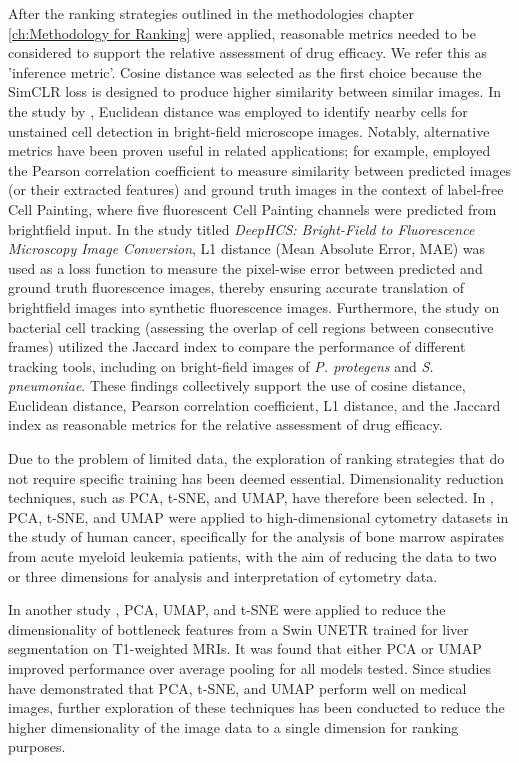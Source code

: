After the ranking strategies outlined in the methodologies chapter  \ref{ch:Methodology for Ranking} were applied, reasonable metrics needed to be considered to support the relative assessment of drug efficacy. We refer this as 'inference metric'. Cosine distance was selected as the first choice because the SimCLR loss is designed to produce higher similarity between similar images. In the study by \cite{Mualla2013ACD}, Euclidean distance was employed to identify nearby cells for unstained cell detection in bright-field microscope images. Notably, alternative metrics have been proven useful in related applications; for example, \cite{CrossZamirski2022LabelFree} employed the Pearson correlation coefficient to measure similarity between predicted images (or their extracted features) and ground truth images in the context of label-free Cell Painting, where five fluorescent Cell Painting channels were predicted from brightfield input. In the study \cite{Lee2018DeepHCS} titled \textit{DeepHCS: Bright-Field to Fluorescence Microscopy Image Conversion}, L1 distance (Mean Absolute Error, MAE) was used as a loss function to measure the pixel-wise error between predicted and ground truth fluorescence images, thereby ensuring accurate translation of brightfield images into synthetic fluorescence images. Furthermore, the study \cite{Todorov2023STrack} on bacterial cell tracking (assessing the overlap of cell regions between consecutive frames) utilized the Jaccard index to compare the performance of different tracking tools, including on bright-field images of \textit{P. protegens} and \textit{S. pneumoniae}. These findings collectively support the use of cosine distance, Euclidean distance, Pearson correlation coefficient, L1 distance, and the Jaccard index as reasonable metrics for the relative assessment of drug efficacy.

Due to the problem of limited data, the exploration of ranking strategies that do not require specific training has been deemed essential. Dimensionality reduction techniques, such as PCA, t-SNE, and UMAP, have therefore been selected. In \cite{keyes2020cancerprimer}, PCA, t-SNE, and UMAP were applied to high-dimensional cytometry datasets in the study of human cancer, specifically for the analysis of bone marrow aspirates from acute myeloid leukemia patients, with the aim of reducing the data to two or three dimensions for analysis and interpretation of cytometry data.

In another study \cite{melba:2024:020:woodland}, PCA, UMAP, and t-SNE were applied to reduce the dimensionality of bottleneck features from a Swin UNETR trained for liver segmentation on T1-weighted MRIs. It was found that either PCA or UMAP improved performance over average pooling for all models tested. Since studies have demonstrated that PCA, t-SNE, and UMAP perform well on medical images, further exploration of these techniques has been conducted to reduce the higher dimensionality of the image data to a single dimension for ranking purposes.